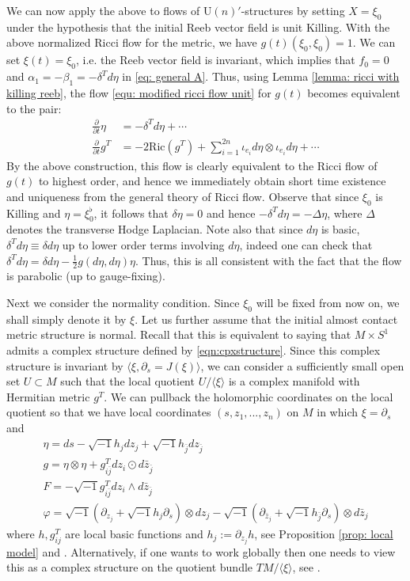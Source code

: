 \documentclass{article}
\theoremstyle{definition}
\newcommand{\w}{\wedge}
\numberwithin{equation}{section}
\begin{document}
We can now apply the above to flows of $\mathrm{U}(n)'$-structures by setting $X=\xi_0$ under the hypothesis that the initial Reeb vector field is unit Killing. With the above normalized Ricci flow for the metric, we have $g(t)(\xi_0,\xi_0)=1$. We can set $\xi(t)=\xi_0$, i.e. the Reeb vector field is invariant, which implies that $f_0=0$ and $\alpha_1=-\beta_1=-\delta^Td\eta$ in \eqref{eq: general A}. Thus, using Lemma \ref{lemma: ricci with killing reeb}, the flow \eqref{equ: modified ricci flow unit} for $g(t)$ becomes equivalent to the pair:
\begin{align}
    \frac{\partial}{\partial t} \eta &= -\delta^T d \eta+\cdots\label{equ: evol eta 1}\\
    \frac{\partial}{\partial t} g^T &= -2\mathrm{Ric}(g^T)+ \sum_{i=1}^{2n}\iota_{e_i}d\eta \otimes\iota_{e_i}d\eta+\cdots\label{equ: evol ricT}
\end{align}
By the above construction, this flow is clearly equivalent to the Ricci flow of $g(t)$ to highest order, and hence we immediately obtain short time existence and uniqueness from the general theory of Ricci flow. Observe that since $\xi_0$ is Killing and $\eta=\xi_0^\flat$, it follows that $\delta\eta=0$ and hence $-\delta^Td\eta=-\Delta\eta$, where $\Delta$ denotes the transverse Hodge Laplacian. Note also that since $d\eta$ is basic, $\delta^Td\eta\equiv\delta d\eta$ up to lower order terms involving $d\eta$, indeed one can check that $\delta^Td\eta=\delta d\eta-\frac{1}{2}g(d\eta,d\eta) \eta$.
Thus, this is all consistent with the fact that the flow is parabolic (up to gauge-fixing). 

Next we consider the normality condition. Since $\xi_0$ will be fixed from now on, we shall simply denote it by $\xi$. Let us further assume that the initial almost contact metric structure is normal. Recall that this is equivalent to saying that  $M\times S^1$ admits a complex structure defined by \eqref{eqn:cpxstructure}. Since this complex structure is invariant by $\langle\xi,\partial_s=J(\xi)\rangle$, we can consider a sufficiently small open set $U\subset M$ such that the local quotient $U/\langle\xi\rangle$ is a complex manifold with Hermitian metric $g^T$. We  can pullback the holomorphic coordinates on the local quotient so that we have local coordinates $(s,z_1,...,z_n)$ on $M$ in which $\xi=\partial_s$ and
\begin{gather*}
    \eta = ds-\sqrt{-1}h_jdz_j+\sqrt{-1}h_{\bar{j}}dz_{\bar{j}}\\
    g=\eta \otimes \eta + g^T_{i\bar{j}}dz_i\odot d\bar{z}_{\bar{j}}\\
    F= -\sqrt{-1}g^T_{i\bar{j}}dz_i\w d\bar{z}_{\bar{j}}\\
    \varphi=\sqrt{-1}(\partial_{z_j}+\sqrt{-1}h_j\partial_s)\otimes dz_j-\sqrt{-1}(\partial_{\bar{z}_j}+\sqrt{-1}h_{\bar{j}}\partial_s)\otimes d\bar{z}_j
\end{gather*}
where $h,g^T_{ij}$ are local basic functions and $h_j:=\partial_{z_j}h$, see Proposition \ref{prop: local model} and \cite{Pawel2000}. Alternatively, if one wants to work globally then one needs to view this as a complex structure on the quotient bundle $TM/\langle \xi \rangle$, see \cite{Smoczyk2010}.
\end{document}
